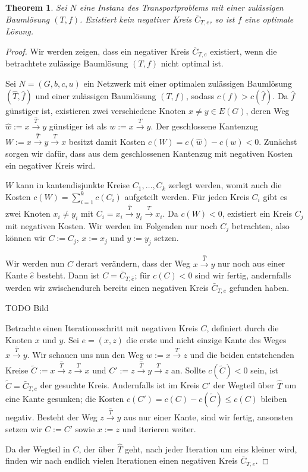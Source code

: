 \documentclass[a4paper,twoside,ngerman]{report}
\theoremstyle{plain}
\newtheorem{thm}{Theorem}
\theoremstyle{definition}
\begin{document}
\begin{thm}Sei $N$ eine Instanz des Transportproblems mit einer zulässigen Baumlösung $(T,f)$. Existiert kein negativer Kreis $\bar{C}_{T,e}$, so ist $f$ eine optimale Lösung.\end{thm}
\begin{proof}Wir werden zeigen, dass ein negativer Kreis $\bar{C}_{T,e}$ existiert, wenn die betrachtete zulässige Baumlösung $(T,f)$ nicht optimal ist.
	
Sei $N=(G,b,c,u)$ ein Netzwerk mit einer optimalen zulässigen Baumlösung $(\hat{T},\hat{f})$ und einer zulässigen Baumlösung $(T,f)$, sodass $c(f)>c(\hat{f})$. Da $\hat{f}$ günstiger ist, existieren zwei verschiedene Knoten $x\neq y\in E(G)$, deren Weg $\hat{w}:=x\xrightarrow{\hat{T}}y$ günstiger ist als $w:=x\xrightarrow{T}y$. Der geschlossene Kantenzug $W:=x\xrightarrow{\hat{T}}y\xrightarrow{T}x$ besitzt damit Kosten $c(W)=c(\hat{w})-c(w)<0$. Zunächst sorgen wir dafür, dass aus dem geschlossenen Kantenzug mit negativen Kosten ein negativer Kreis wird.

$W$ kann in kantendisjunkte Kreise $C_1,\ldots,C_k$ zerlegt werden, womit auch die Kosten $c(W)=\sum_{i=1}^{k}c(C_i)$ aufgeteilt werden. Für jeden Kreis $C_i$ gibt es zwei Knoten $x_i\neq y_i$ mit $C_i=x_i\xrightarrow{\hat{T}}y_i\xrightarrow{T}x_i$. Da $c(W)<0$, existiert ein Kreis $C_j$ mit negativen Kosten. Wir werden im Folgenden nur noch $C_j$ betrachten, also können wir $C:=C_j$, $x:=x_j$ und $y:=y_j$ setzen.

Wir werden nun $C$ derart verändern, dass der Weg $x\xrightarrow{\hat{T}}y$ nur noch aus einer Kante $\hat{e}$ besteht. Dann ist $C=\bar{C}_{T,\hat{e}}$; für $c(C)<0$ sind wir fertig, andernfalls werden wir zwischendurch bereits einen negativen Kreis $\bar{C}_{T,e}$ gefunden haben.

TODO Bild

Betrachte einen Iterationsschritt mit negativen Kreis $C$, definiert durch die Knoten $x$ und $y$. Sei $e=(x,z)$ die erste und nicht einzige Kante des Weges $x\xrightarrow{\hat{T}}y$. Wir schauen uns nun den Weg $w:=x\xrightarrow{T}z$ und die beiden entstehenden Kreise $\tilde{C}:=x\xrightarrow{\hat{T}}z\xrightarrow{T}x$ und $C':=z\xrightarrow{\hat{T}}y\xrightarrow{T}z$ an. Sollte $c(\tilde{C})<0$ sein, ist $\tilde{C}=\bar{C}_{T,e}$ der gesuchte Kreis. Andernfalls ist im Kreis $C'$ der Wegteil über $\hat{T}$ um eine Kante gesunken; die Kosten $c(C')=c(C)-c(\tilde{C})\leq c(C)$ bleiben negativ. Besteht der Weg $z\xrightarrow{\hat{T}}y$ aus nur einer Kante, sind wir fertig, ansonsten setzen wir $C:=C'$ sowie $x:=z$ und iterieren weiter.

Da der Wegteil in $C$, der über $\hat{T}$ geht, nach jeder Iteration um eins kleiner wird, finden wir nach endlich vielen Iterationen einen negativen Kreis $\bar{C}_{T,e}$.\end{proof}
\end{document}
